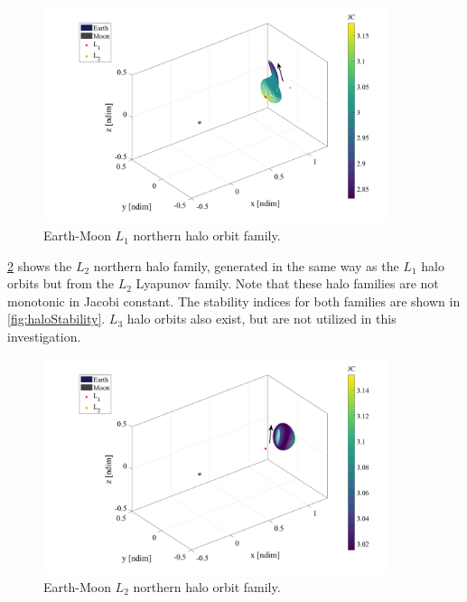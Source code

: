 \begin{figure}[H]
    \centering
    \includegraphics[width=0.9\textwidth]{figures/L1HaloFamily.pdf}
    \caption{Earth-Moon $L_{1}$ northern halo orbit family.}
    \label{fig:L1Halo}
\end{figure}

\cref{fig:L2Halo} shows the $L_{2}$ northern halo family, generated in the same way as the $L_{1}$
halo orbits but from the $L_{2}$ Lyapunov family. Note that these halo families are not monotonic
in Jacobi constant. The stability indices for both families are shown in \cref{fig:haloStability}.
$L_{3}$ halo orbits also exist, but are not utilized in this investigation.

\begin{figure}[H]
    \centering
    \includegraphics[width=0.9\textwidth]{figures/L2HaloFamily.pdf}
    \caption{Earth-Moon $L_{2}$ northern halo orbit family.}
    \label{fig:L2Halo}
\end{figure}

